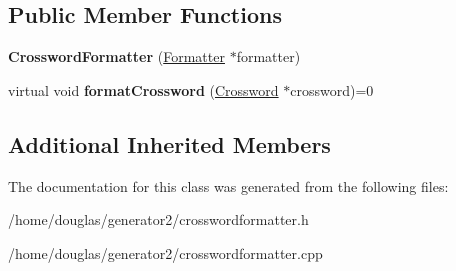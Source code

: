 \subsection*{Public Member Functions}
\begin{DoxyCompactItemize}
\item 
{\bfseries Crossword\+Formatter} (\hyperlink{classFormatter}{Formatter} $\ast$formatter)\hypertarget{classCrosswordFormatter_a2e35f71179c3e6cbd7aedd9d680bd8e4}{}\label{classCrosswordFormatter_a2e35f71179c3e6cbd7aedd9d680bd8e4}

\item 
virtual void {\bfseries format\+Crossword} (\hyperlink{classCrossword}{Crossword} $\ast$crossword)=0\hypertarget{classCrosswordFormatter_ad580e878ff44afc01cac77ff45e43d54}{}\label{classCrosswordFormatter_ad580e878ff44afc01cac77ff45e43d54}

\end{DoxyCompactItemize}
\subsection*{Additional Inherited Members}


The documentation for this class was generated from the following files\+:\begin{DoxyCompactItemize}
\item 
/home/douglas/generator2/crosswordformatter.\+h\item 
/home/douglas/generator2/crosswordformatter.\+cpp\end{DoxyCompactItemize}
